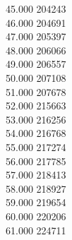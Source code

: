 { 45.000	204243 \\
 46.000	204691 \\
 47.000	205397 \\
 48.000	206066 \\
 49.000	206557 \\
 50.000	207108 \\
 51.000	207678 \\
 52.000	215663 \\
 53.000	216256 \\
 54.000	216768 \\
 55.000	217274 \\
 56.000	217785 \\
 57.000	218413 \\
 58.000	218927 \\
 59.000	219654 \\
 60.000	220206 \\
 61.000	224711 \\
}
